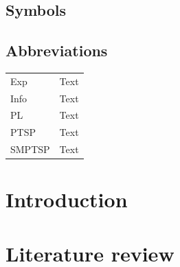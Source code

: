 \documentclass[a4paper, 10pt, twoside, openright]{book}
\begin{document}
\section*{Symbols}


\section*{Abbreviations}

\begin{tabular}{ll}
Exp		& Text\\
Info	& Text\\
PL		& Text\\
PTSP	& Text\\
SMPTSP	& Text\\
\end{tabular}


\tableofcontents 
\begin{samepage}
\listoffigures
\let\clearpage\relax
\listoftables
\end{samepage}


\mainmatter


\chapter{Introduction}



\chapter{Literature review}
\end{document}
